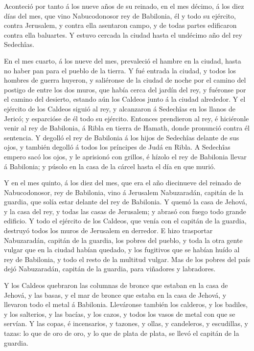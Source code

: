  Aconteció por tanto á los nueve años de su reinado, en el
mes décimo, á los diez días del mes, que vino Nabucodonosor rey de
Babilonia, él y todo su ejército, contra Jerusalem, y contra ella
asentaron campo, y de todas partes edificaron contra ella baluartes.
 Y estuvo cercada la ciudad hasta el undécimo año del rey
Sedechîas.

 En el mes cuarto, á los nueve del mes, prevaleció el hambre
en la ciudad, hasta no haber pan para el pueblo de la tierra.
 Y fué entrada la ciudad, y todos los hombres de guerra
huyeron, y saliéronse de la ciudad de noche por el camino del postigo de
entre los dos muros, que había cerca del jardín del rey, y fuéronse por
el camino del desierto, estando aún los Caldeos junto á la ciudad
alrededor.  Y el ejército de los Caldeos siguió al rey, y
alcanzaron á Sedechîas en los llanos de Jericó; y esparcióse de él todo
su ejército.  Entonces prendieron al rey, é hiciéronle venir
al rey de Babilonia, á Ribla en tierra de Hamath, donde pronunció contra
él sentencia.  Y degolló el rey de Babilonia á los hijos de
Sedechîas delante de sus ojos, y también degolló á todos los príncipes
de Judá en Ribla.  A Sedechîas empero sacó los ojos, y le
aprisionó con grillos, é hízolo el rey de Babilonia llevar á Babilonia;
y púsolo en la casa de la cárcel hasta el día en que murió.

 Y en el mes quinto, á los diez del mes, que era el año
diecinueve del reinado de Nabucodonosor, rey de Babilonia, vino á
Jerusalem Nabuzaradán, capitán de la guardia, que solía estar delante
del rey de Babilonia.  Y quemó la casa de Jehová, y la casa
del rey, y todas las casas de Jerusalem; y abrasó con fuego todo grande
edificio.  Y todo el ejército de los Caldeos, que venía con
el capitán de la guardia, destruyó todos los muros de Jerusalem en
derredor.  E hizo trasportar Nabuzaradán, capitán de la
guardia, los pobres del pueblo, y toda la otra gente vulgar que en la
ciudad habían quedado, y los fugitivos que se habían huído al rey de
Babilonia, y todo el resto de la multitud vulgar.  Mas de
los pobres del país dejó Nabuzaradán, capitán de la guardia, para
viñadores y labradores.

 Y los Caldeos quebraron las columnas de bronce que estaban
en la casa de Jehová, y las basas, y el mar de bronce que estaba en la
casa de Jehová, y llevaron todo el metal á Babilonia. 
Lleváronse también los calderos, y los badiles, y los salterios, y las
bacías, y los cazos, y todos los vasos de metal con que se servían.
 Y las copas, é incensarios, y tazones, y ollas, y
candeleros, y escudillas, y tazas: lo que de oro de oro, y lo que de
plata de plata, se llevó el capitán de la guardia.

